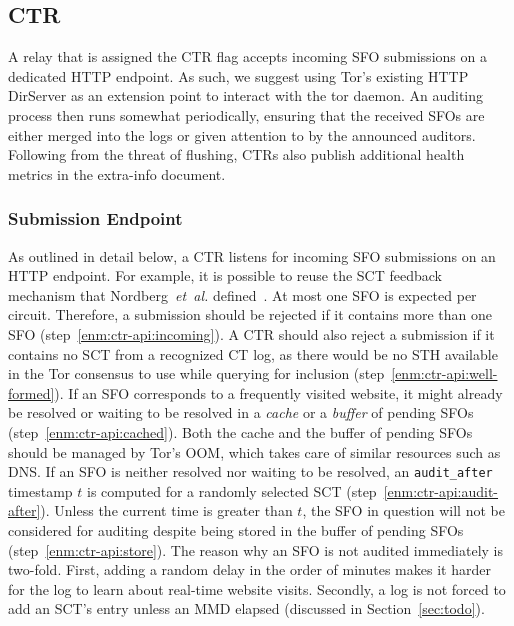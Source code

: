 %
%

\subsection{CTR}
A relay that is assigned the CTR flag accepts incoming SFO submissions on a
dedicated HTTP endpoint.  As such, we suggest using Tor's existing HTTP
DirServer as an extension point to interact with the tor daemon.  An auditing
process then runs somewhat periodically, ensuring that the received SFOs are
either merged into the logs or given attention to by the announced auditors.
Following from the threat of flushing, CTRs also publish additional health
metrics in the extra-info document.

\subsubsection{Submission Endpoint} \label{sec:design:api}
As outlined in detail below, a CTR listens for incoming SFO submissions on an
HTTP endpoint.  For example, it is possible to reuse the SCT feedback mechanism
that Nordberg~\emph{et~al.} defined~\cite{nordberg}.  At most one SFO is
expected per circuit.  Therefore, a submission should be rejected if it
contains more than one SFO (step~\ref{enm:ctr-api:incoming}).
A CTR should also reject a submission if it contains no SCT from a recognized CT
log, as there would be no STH available in the Tor consensus to use while
querying for inclusion (step~\ref{enm:ctr-api:well-formed}).
If an SFO corresponds to a frequently visited website, it might already be
resolved or waiting to be resolved in a \emph{cache} or a \emph{buffer} of
pending SFOs (step~\ref{enm:ctr-api:cached}).
Both the cache and the buffer of pending SFOs should be managed by Tor's OOM,
which takes care of similar resources such as DNS.  If an SFO is neither
resolved nor waiting to be resolved, an \texttt{audit\_after} timestamp $t$ is
computed for a randomly selected SCT (step~\ref{enm:ctr-api:audit-after}).
Unless the current time is greater than $t$, the SFO in question will not be
considered for auditing despite being stored in the buffer of pending SFOs
(step~\ref{enm:ctr-api:store}).
The reason why an SFO is not audited immediately is two-fold.  First, adding a
random delay in the order of minutes makes it harder for the log to learn about
real-time website visits.  Secondly, a log is not forced to add an SCT's entry
unless an MMD elapsed (discussed in Section~\ref{sec:todo}).

